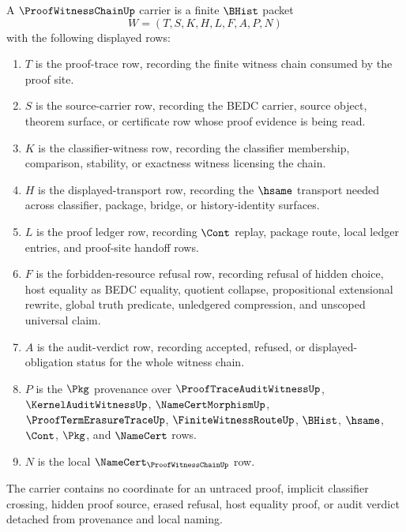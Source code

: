 \begin{definition}
\label{def:proof-witness-chain-carrier}
A $\ProofWitnessChainUp$ carrier is a finite $\BHist$ packet
$$
W=(T,S,K,H,L,F,A,P,N)
$$
with the following displayed rows:
\begin{enumerate}
\item $T$ is the proof-trace row, recording the finite witness chain consumed by the proof site.
\item $S$ is the source-carrier row, recording the BEDC carrier, source object, theorem surface, or certificate row whose proof evidence is being read.
\item $K$ is the classifier-witness row, recording the classifier membership, comparison, stability, or exactness witness licensing the chain.
\item $H$ is the displayed-transport row, recording the $\hsame$ transport needed across classifier, package, bridge, or history-identity surfaces.
\item $L$ is the proof ledger row, recording $\Cont$ replay, package route, local ledger entries, and proof-site handoff rows.
\item $F$ is the forbidden-resource refusal row, recording refusal of hidden choice, host equality as BEDC equality, quotient collapse, propositional extensional rewrite, global truth predicate, unledgered compression, and unscoped universal claim.
\item $A$ is the audit-verdict row, recording accepted, refused, or displayed-obligation status for the whole witness chain.
\item $P$ is the $\Pkg$ provenance over $\ProofTraceAuditWitnessUp$, $\KernelAuditWitnessUp$, $\NameCertMorphismUp$, $\ProofTermErasureTraceUp$, $\FiniteWitnessRouteUp$, $\BHist$, $\hsame$, $\Cont$, $\Pkg$, and $\NameCert$ rows.
\item $N$ is the local $\NameCert_{\ProofWitnessChainUp}$ row.
\end{enumerate}
The carrier contains no coordinate for an untraced proof, implicit classifier crossing, hidden proof source, erased refusal, host equality proof, or audit verdict detached from provenance and local naming.
\end{definition}

